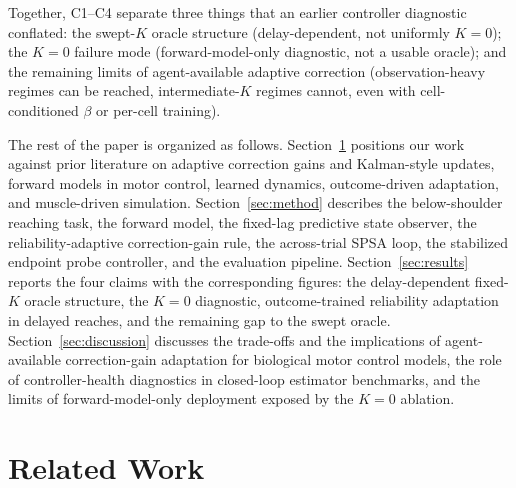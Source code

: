 \documentclass[sn-mathphys,NameDate,iicol]{sn-jnl}
\begin{document}
Together, C1--C4 separate three things that an earlier controller
diagnostic conflated: the swept-$K$ oracle structure (delay-dependent,
not uniformly $K\!=\!0$); the $K\!=\!0$ failure mode
(forward-model-only diagnostic, not a usable oracle); and the
remaining limits of agent-available adaptive correction
(observation-heavy regimes can be reached, intermediate-$K$ regimes
cannot, even with cell-conditioned $\beta$ or per-cell training).

The rest of the paper is organized as follows.
Section~\ref{sec:related} positions our work against prior literature
on adaptive correction gains and Kalman-style updates, forward models
in motor control, learned dynamics, outcome-driven adaptation, and
muscle-driven simulation.
Section~\ref{sec:method} describes the below-shoulder reaching task,
the forward model, the fixed-lag predictive state observer, the
reliability-adaptive correction-gain rule, the across-trial SPSA
loop, the stabilized endpoint probe controller, and the evaluation
pipeline.
Section~\ref{sec:results} reports the four claims with the
corresponding figures: the delay-dependent fixed-$K$ oracle
structure, the $K\!=\!0$ diagnostic, outcome-trained reliability
adaptation in delayed reaches, and the remaining gap to the swept
oracle.
Section~\ref{sec:discussion} discusses the trade-offs and the
implications of agent-available correction-gain adaptation for
biological motor control models, the role of controller-health
diagnostics in closed-loop estimator benchmarks, and the limits of
forward-model-only deployment exposed by the $K\!=\!0$ ablation.

\section{Related Work}
\label{sec:related}
\end{document}

